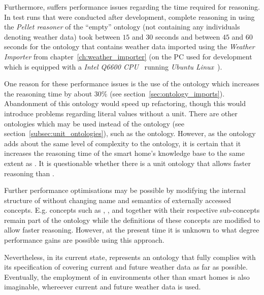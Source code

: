 Furthermore, \smarthomeweather suffers performance issues regarding the time required for reasoning. In test runs that were conducted after development, complete reasoning in \protege using the \emph{Pellet reasoner} of the ``empty'' ontology (not containing any individuals denoting weather data) took between $15$ and $30$ seconds and between $45$ and $60$ seconds for the ontology that contains weather data imported using the \emph{Weather Importer} from chapter~\ref{ch:weather_importer} (on the PC used for development which is equipped with a \emph{Intel Q6600 CPU}~\cite{intel_q6600} running \emph{Ubuntu Linux}~\cite{ubuntu}).

One reason for these performance issues is the use of the \muo ontology which increases the reasoning time by about $30 \%$ (see section~\ref{sec:ontology_imports}). Abandonment of this ontology would speed up refactoring, though this would introduce problems regarding literal values without a unit. There are other ontologies which may be used instead of the \muo ontology (see section~\ref{subsec:unit_ontologies}), such as the  ontology. However, as the  ontology adds about the same level of complexity to the ontology, it is certain that it increases the reasoning time of the smart home's knowledge base to the same extent as \muo. It is questionable whether there is a unit ontology that allows faster reasoning than \muo.

Further performance optimisations may be possible by modifying the internal structure of \smarthomeweather without changing name and semantics of externally accessed concepts. E.g. concepts such as , , and  together with their respective sub-concepts remain part of the ontology while the definitions of these concepts are modified to allow faster reasoning. However, at the present time it is unknown to what degree performance gains are possible using this approach.

\vspace{1cm}

Nevertheless, in its current state, \smarthomeweather represents an ontology that fully complies with its specification of covering current and future weather data as far as possible. Eventually, the employment of \smarthomeweather in environments other than smart homes is also imaginable, whereever current and future weather data is used.
